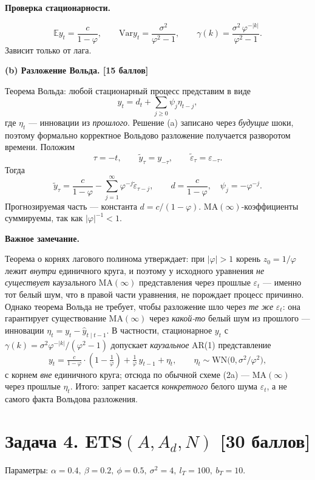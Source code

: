 \documentclass[11pt,a4paper]{article}
\newcommand{\E}{\mathbb{E}}
\newcommand{\Var}{\mathrm{Var}}
\newcommand{\eps}{\varepsilon}
\newcommand{\step}[1]{\medskip\noindent\textbf{#1}\par\nobreak\vspace{2pt}}
\begin{document}
\step{Проверка стационарности.}
\[
\E y_t=\frac{c}{1-\varphi},\qquad
\Var y_t=\frac{\sigma^2}{\varphi^2-1},\qquad
\gamma(k)=\frac{\sigma^2\,\varphi^{-|k|}}{\varphi^2-1}.
\]
Зависит только от лага. \checkmark

\step{(b) Разложение Вольда. \hfill [15 баллов]}
Теорема Вольда: любой стационарный процесс представим в виде
\[
y_t=d_t+\sum_{j\ge 0}\psi_j\eta_{t-j},
\]
где \(\eta_t\) --- инновации из \emph{прошлого}. Решение (a) записано через \emph{будущие} шоки, поэтому формально корректное Вольдово разложение получается разворотом времени. Положим
\[
\tau=-t,\qquad \widetilde y_\tau=y_{-\tau},\qquad \widetilde\eps_\tau=\eps_{-\tau}.
\]
Тогда
\[
\widetilde y_\tau=\frac{c}{1-\varphi}-\sum_{j=1}^{\infty}\varphi^{-j}\widetilde\eps_{\tau-j},
\qquad d=\frac{c}{1-\varphi},\quad\psi_j=-\varphi^{-j}.
\]
Прогнозируемая часть --- константа \(d=c/(1-\varphi)\). MA\((\infty)\)-коэффициенты суммируемы, так как \(|\varphi|^{-1}<1\).

\step{Важное замечание.}
Теорема о корнях лагового полинома утверждает: при \(|\varphi|>1\) корень \(z_0=1/\varphi\) лежит \emph{внутри} единичного круга, и поэтому у исходного уравнения \emph{не существует} каузального MA\((\infty)\) представления через прошлые \(\eps_t\) --- именно тот белый шум, что в правой части уравнения, не порождает процесс причинно. Однако теорема Вольда не требует, чтобы разложение шло через \emph{те же} \(\eps_t\): она гарантирует существование MA\((\infty)\) через \emph{какой-то} белый шум из прошлого --- инновации \(\eta_t=y_t-\widehat y_{t\mid t-1}\). В частности, стационарное \(y_t\) с \(\gamma(k)=\sigma^2\varphi^{-|k|}/(\varphi^2-1)\) допускает \emph{каузальное} AR(1) представление
\[
y_t=\tfrac{c}{1-\varphi}\cdot(1-\tfrac{1}{\varphi})+\tfrac{1}{\varphi}\,y_{t-1}+\eta_t,
\qquad \eta_t\sim\mathrm{WN}\bigl(0,\sigma^2/\varphi^2\bigr),
\]
с корнем \emph{вне} единичного круга; отсюда по обычной схеме (2a) --- MA\((\infty)\) через прошлые \(\eta_t\). Итого: запрет касается \emph{конкретного} белого шума \(\eps_t\), а не самого факта Вольдова разложения.

\section*{Задача 4. ETS\texorpdfstring{$(A,A_d,N)$}{(A,Ad,N)} \hfill \normalsize[30 баллов]}

Параметры: \(\alpha=0.4,\ \beta=0.2,\ \phi=0.5,\ \sigma^2=4,\ l_T=100,\ b_T=10.\)
\end{document}
